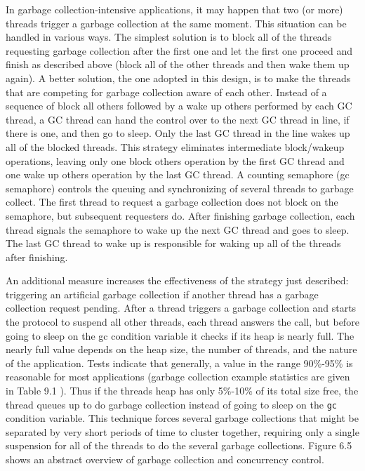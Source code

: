 In garbage collection-intensive applications, it may happen that two (or
more) threads trigger a garbage collection at the same moment. This
situation can be handled in various ways.  The simplest solution is to
block all of the threads requesting garbage collection after the first one
and let the first one proceed and finish as described above (block all of
the other threads and then wake them up again). A better solution, the one
adopted in this design, is to make the threads that are competing for
garbage collection aware of each other. Instead of a sequence of block all
others followed by a wake up others performed by each GC thread, a GC
thread can hand the control over to the next GC thread in line, if there is
one, and then go to sleep. Only the last GC thread in the line wakes up all
of the blocked threads. This strategy eliminates intermediate block/wakeup
operations, leaving only one block others operation by the first GC thread
and one wake up others operation by the last GC thread. A counting
semaphore (gc semaphore) controls the queuing and synchronizing of several
threads to garbage collect.  The first thread to request a garbage
collection does not block on the semaphore, but subsequent requesters
do. After finishing garbage collection, each thread signals the semaphore
to wake up the next GC thread and goes to sleep. The last GC thread to wake
up is responsible for waking up all of the threads after finishing.

An additional measure increases the effectiveness of the strategy just
described: triggering an artificial garbage collection if another thread
has a garbage collection request pending. After a thread triggers a garbage
collection and starts the protocol to suspend all other threads, each
thread answers the call, but before going to sleep on the gc condition
variable it checks if its heap is nearly full. The nearly full value
depends on the heap size, the number of threads, and the nature of the
application. Tests indicate that generally, a value in the range 90\%-95\%
is reasonable for most applications (garbage collection example statistics
are given in {\color{red} Table 9.1} ). Thus if the threads heap has only
5\%-10\% of its total size free, the thread queues up to do garbage
collection instead of going to sleep on the \texttt{gc} condition variable.
This technique forces several garbage collections that might be separated
by very short periods of time to cluster together, requiring only a single
suspension for all of the threads to do the several garbage
collections. {\color{red} Figure 6.5} shows an abstract overview of garbage
collection and concurrency control.

